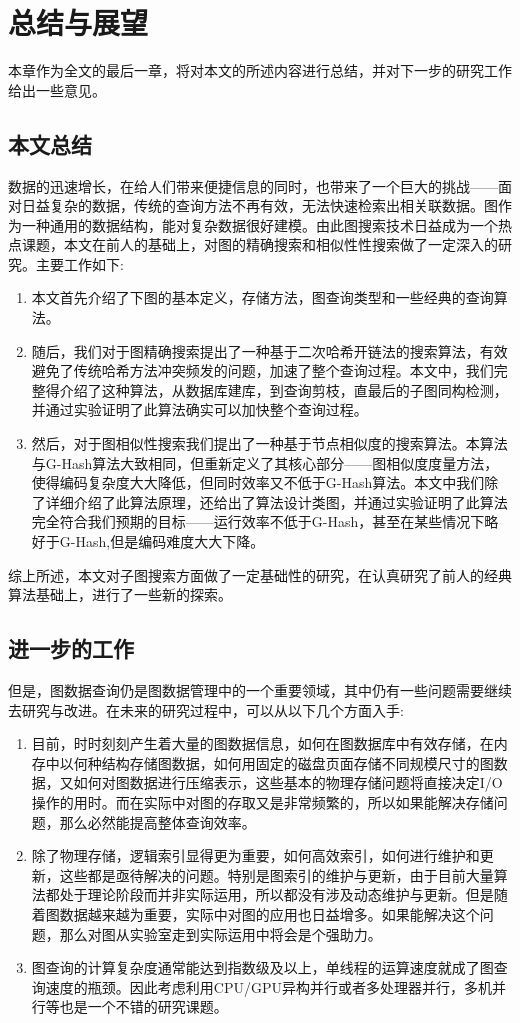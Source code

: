 \documentclass{XDBAthesis}
\begin{document}
\else
\fi
\chapter{总结与展望}
\label{chap:future}
本章作为全文的最后一章，将对本文的所述内容进行总结，并对下一步的研究工作给出一些意见。
\section{本文总结}
数据的迅速增长，在给人们带来便捷信息的同时，也带来了一个巨大的挑战——面对日益复杂的数据，传统的查询方法不再有效，无法快速检索出相关联数据。图作为一种通用的数据结构，能对复杂数据很好建模。由此图搜索技术日益成为一个热点课题，本文在前人的基础上，对图的精确搜索和相似性性搜索做了一定深入的研究。主要工作如下:
\begin{enumerate}
    \item 本文首先介绍了下图的基本定义，存储方法，图查询类型和一些经典的查询算法。
    \item 随后，我们对于图精确搜索提出了一种基于二次哈希开链法的搜索算法，有效避免了传统哈希方法冲突频发的问题，加速了整个查询过程。本文中，我们完整得介绍了这种算法，从数据库建库，到查询剪枝，直最后的子图同构检测，并通过实验证明了此算法确实可以加快整个查询过程。
    \item 然后，对于图相似性搜索我们提出了一种基于节点相似度的搜索算法。本算法与G-Hash算法大致相同，但重新定义了其核心部分——图相似度度量方法，使得编码复杂度大大降低，但同时效率又不低于G-Hash算法。本文中我们除了详细介绍了此算法原理，还给出了算法设计类图，并通过实验证明了此算法完全符合我们预期的目标——运行效率不低于G-Hash，甚至在某些情况下略好于G-Hash,但是编码难度大大下降。
\end{enumerate}

综上所述，本文对子图搜索方面做了一定基础性的研究，在认真研究了前人的经典算法基础上，进行了一些新的探索。
\section{进一步的工作}
但是，图数据查询仍是图数据管理中的一个重要领域，其中仍有一些问题需要继续去研究与改进。在未来的研究过程中，可以从以下几个方面入手:
\begin{enumerate}
    \item 目前，时时刻刻产生着大量的图数据信息，如何在图数据库中有效存储，在内存中以何种结构存储图数据，如何用固定的磁盘页面存储不同规模尺寸的图数据，又如何对图数据进行压缩表示，这些基本的物理存储问题将直接决定I/O操作的用时。而在实际中对图的存取又是非常频繁的，所以如果能解决存储问题，那么必然能提高整体查询效率。
    \item 除了物理存储，逻辑索引显得更为重要，如何高效索引，如何进行维护和更新，这些都是亟待解决的问题。特别是图索引的维护与更新，由于目前大量算法都处于理论阶段而并非实际运用，所以都没有涉及动态维护与更新。但是随着图数据越来越为重要，实际中对图的应用也日益增多。如果能解决这个问题，那么对图从实验室走到实际运用中将会是个强助力。
    \item 图查询的计算复杂度通常能达到指数级及以上，单线程的运算速度就成了图查询速度的瓶颈。因此考虑利用CPU/GPU异构并行或者多处理器并行，多机并行等也是一个不错的研究课题。
\end{enumerate}


\ifx\allfiles\undefined
%

\end{document}
